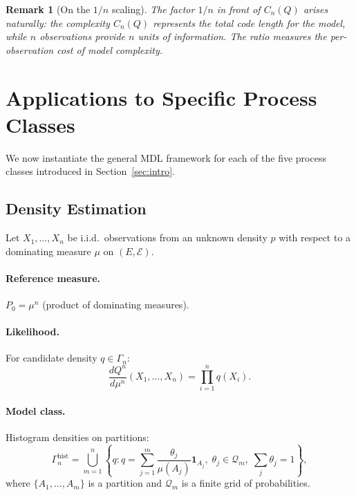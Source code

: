 \documentclass[preprint,review,12pt]{article}
\newtheorem{remark}[theorem]{Remark}
\begin{document}
\begin{remark}[On the $1/n$ scaling]
The factor $1/n$ in front of $C_n(Q)$ arises naturally: the complexity 
$C_n(Q)$ represents the total code length for the model, while $n$ observations 
provide $n$ units of information. The ratio measures the per-observation 
cost of model complexity.
\end{remark}

\section{Applications to Specific Process Classes}
\label{sec:applications}

We now instantiate the general MDL framework for each of the five process 
classes introduced in Section~\ref{sec:intro}.

\subsection{Density Estimation}
\label{subsec:density}

Let $X_1, \ldots, X_n$ be i.i.d.\ observations from an unknown density $p$ 
with respect to a dominating measure $\mu$ on $(E, \mathcal{E})$.

\paragraph{Reference measure.} $P_0 = \mu^n$ (product of dominating measures).

\paragraph{Likelihood.} For candidate density $q \in \Gamma_n$:
\begin{equation}\label{eq:density_likelihood}
\frac{dQ^n}{d\mu^n}(X_1, \ldots, X_n) = \prod_{i=1}^n q(X_i).
\end{equation}

\paragraph{Model class.} Histogram densities on partitions:
\begin{equation}\label{eq:histogram_class}
\Gamma_n^{\text{hist}} = \bigcup_{m=1}^{n} \left\{ q : q = \sum_{j=1}^m 
\frac{\theta_j}{\mu(A_j)} \mathbf{1}_{A_j}, \; \theta_j \in \mathcal{Q}_m, 
\; \sum_j \theta_j = 1 \right\},
\end{equation}
where $\{A_1, \ldots, A_m\}$ is a partition and $\mathcal{Q}_m$ is a finite 
grid of probabilities.
\end{document}
